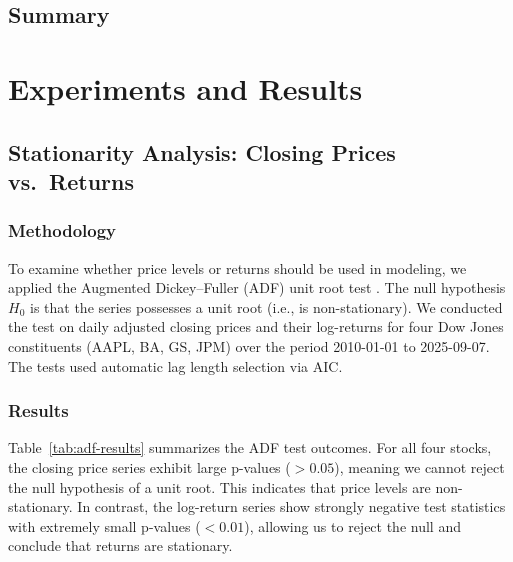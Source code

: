 \documentclass[12pt,a4paper]{report}
\begin{document}
\section{Summary}



\chapter{Experiments and Results}


\section{Stationarity Analysis: Closing Prices vs.\ Returns}

\subsection{Methodology}
To examine whether price levels or returns should be used in modeling, we applied the
Augmented Dickey--Fuller (ADF) unit root test \cite{dickey1979distribution}. The null
hypothesis $H_0$ is that the series possesses a unit root (i.e., is non-stationary).  
We conducted the test on daily adjusted closing prices and their log-returns for
four Dow Jones constituents (AAPL, BA, GS, JPM) over the period
2010-01-01 to 2025-09-07.  
The tests used automatic lag length selection via AIC.

\subsection{Results}
Table~\ref{tab:adf-results} summarizes the ADF test outcomes. For all four stocks,
the closing price series exhibit large p-values ($>0.05$), meaning we cannot reject
the null hypothesis of a unit root. This indicates that price levels are non-stationary.
In contrast, the log-return series show strongly negative test statistics with
extremely small p-values ($<0.01$), allowing us to reject the null and conclude that
returns are stationary.
\end{document}
